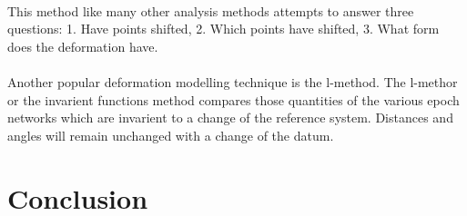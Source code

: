 \documentclass{article}
\begin{document}
\paragraph{}
This method like many other analysis methods attempts to answer three questions:
1. Have points shifted, 2. Which points have shifted, 3. What form does the deformation 
have.
\paragraph{}
Another popular deformation modelling technique is the l-method. The l-methor or the
invarient functions method compares those quantities of the various epoch networks
which are invarient to a change of the reference system. Distances and angles will
remain unchanged with a change of the datum.

\section{Conclusion}
\end{document}
